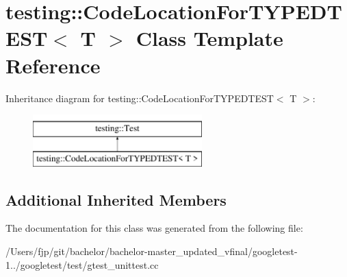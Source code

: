 \hypertarget{classtesting_1_1_code_location_for_t_y_p_e_d_t_e_s_t}{}\section{testing\+:\+:Code\+Location\+For\+T\+Y\+P\+E\+D\+T\+E\+ST$<$ T $>$ Class Template Reference}
\label{classtesting_1_1_code_location_for_t_y_p_e_d_t_e_s_t}
Inheritance diagram for testing\+:\+:Code\+Location\+For\+T\+Y\+P\+E\+D\+T\+E\+ST$<$ T $>$\+:\begin{figure}[H]
\begin{center}
\leavevmode
\includegraphics[height=2.000000cm]{classtesting_1_1_code_location_for_t_y_p_e_d_t_e_s_t}
\end{center}
\end{figure}
\subsection*{Additional Inherited Members}


The documentation for this class was generated from the following file\+:\begin{DoxyCompactItemize}
\item 
/\+Users/fjp/git/bachelor/bachelor-\/master\+\_\+updated\+\_\+vfinal/googletest-\/1../googletest/test/gtest\+\_\+unittest.\+cc\end{DoxyCompactItemize}

